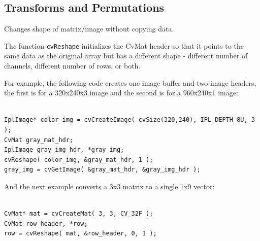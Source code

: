\subsection{Transforms and Permutations}

\label{Reshape}

Changes shape of matrix/image without copying data.


\begin{description}
\ifC
{}
\fi
{}
\end{description}

The function \texttt{cvReshape} initializes the CvMat header so that it points to the same data as the original array but has a different shape - different number of channels, different number of rows, or both.

\ifC
For example, the following code creates one image buffer and two image headers, the first is for a 320x240x3 image and the second is for a 960x240x1 image:

\begin{lstlisting}

IplImage* color_img = cvCreateImage( cvSize(320,240), IPL_DEPTH_8U, 3 );
CvMat gray_mat_hdr;
IplImage gray_img_hdr, *gray_img;
cvReshape( color_img, &gray_mat_hdr, 1 );
gray_img = cvGetImage( &gray_mat_hdr, &gray_img_hdr );

\end{lstlisting}

And the next example converts a 3x3 matrix to a single 1x9 vector:

\begin{lstlisting}

CvMat* mat = cvCreateMat( 3, 3, CV_32F );
CvMat row_header, *row;
row = cvReshape( mat, &row_header, 0, 1 );

\end{lstlisting}
\fi

\label{ReshapeMatND}

